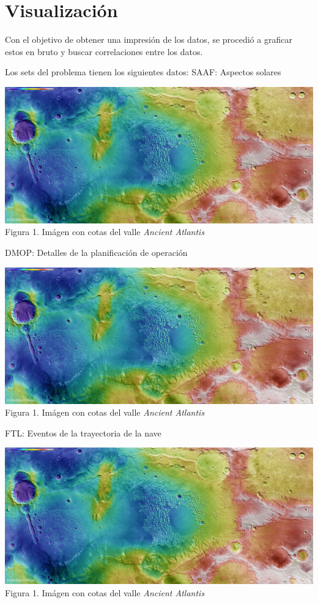 \documentclass[../Main.tex]{subfiles}
\begin{document}
\section{Visualización}
Con el objetivo de obtener una impresión de los datos, se procedió a graficar estos en bruto y buscar correlaciones entre los datos. 
\newline \par
Los sets del problema tienen los siguientes datos:
SAAF: Aspectos solares
\begin{center}
\includegraphics[width=\linewidth, trim={0 10cm 0 0}, clip]{Assets/Ancient_Atlantis.jpg}
\\Figura 1. Imágen con cotas del valle \textit{Ancient Atlantis}
\end{center}
DMOP: Detalles de la planificación de operación
\begin{center}
\includegraphics[width=\linewidth, trim={0 10cm 0 0}, clip]{Assets/Ancient_Atlantis.jpg}
\\Figura 1. Imágen con cotas del valle \textit{Ancient Atlantis}
\end{center}
FTL: Eventos de la trayectoria de la nave
\begin{center}
\includegraphics[width=\linewidth, trim={0 10cm 0 0}, clip]{Assets/Ancient_Atlantis.jpg}
\\Figura 1. Imágen con cotas del valle \textit{Ancient Atlantis}
\end{center}
\end{document}
